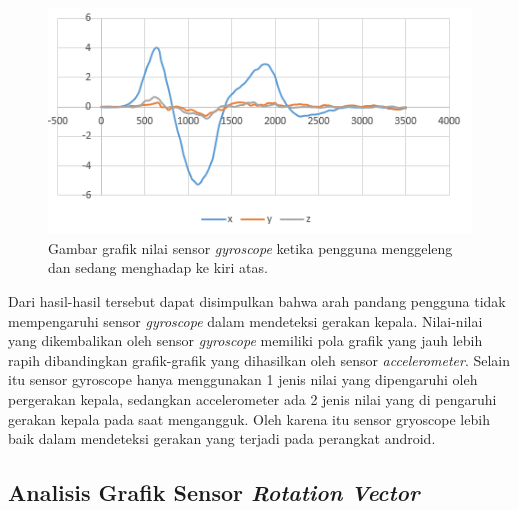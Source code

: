 \begin{figure}[htbp]
\centering
\includegraphics[scale=1]{Gambar/grafik-sensor-gyroscope-menggeleng-depan.png}
\caption{Gambar grafik nilai sensor \textit{gyroscope} ketika pengguna menggeleng dan sedang menghadap ke kiri atas.} 
\label{fig:grafik-sensor-gyroscope-menggeleng-kiri-atas}
\end{figure}

Dari hasil-hasil tersebut dapat disimpulkan bahwa arah pandang pengguna tidak mempengaruhi sensor \textit{gyroscope} dalam mendeteksi gerakan kepala. Nilai-nilai yang dikembalikan oleh sensor \textit{gyroscope} memiliki  pola grafik yang jauh lebih rapih dibandingkan grafik-grafik yang dihasilkan oleh sensor \textit{accelerometer}. Selain itu sensor gyroscope hanya menggunakan 1 jenis nilai yang dipengaruhi oleh pergerakan kepala, sedangkan accelerometer ada 2 jenis nilai yang di pengaruhi gerakan kepala pada saat mengangguk. Oleh karena itu sensor gryoscope lebih baik dalam mendeteksi gerakan yang terjadi pada perangkat android.

\subsection{Analisis Grafik Sensor \textit{Rotation Vector}}
\label{sec:analisis_grafik_sensor_rotation_vector}

